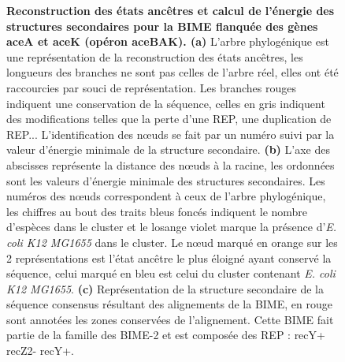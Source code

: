 \documentclass[12pt,a4paper]{report}
\begin{document}
\begin{onehalfspace}
\begin{figure}
{\caption{\textbf{Reconstruction des états ancêtres et calcul de l'énergie des structures secondaires pour la BIME flanquée des gènes aceA et aceK (opéron aceBAK). (a)} L'arbre phylogénique est une représentation de la reconstruction des états ancêtres, les longueurs des branches ne sont pas celles de l'arbre réel, elles ont été raccourcies par souci de représentation. Les branches rouges indiquent une conservation de la séquence, celles en gris indiquent des modifications telles que la perte d'une REP, une duplication de REP... L'identification des nœuds se fait par un numéro suivi par la valeur d'énergie minimale de la structure secondaire. \textbf{(b)} L'axe des abscisses représente la distance des nœuds à la racine, les ordonnées sont les valeurs d'énergie minimale des structures secondaires. Les numéros des nœuds correspondent à ceux de l'arbre phylogénique, les chiffres au bout des traits bleus foncés indiquent le nombre d'espèces dans le cluster et le losange violet marque la présence d'\textit{E. coli K12 MG1655} dans le cluster. Le nœud marqué en orange sur les 2 représentations est l'état ancêtre le plus éloigné ayant conservé la séquence, celui marqué en bleu est celui du cluster contenant \textit{E. coli K12 MG1655}. \textbf{(c)} Représentation de la structure secondaire de la séquence consensus résultant des alignements de la BIME, en rouge sont annotées les zones conservées de l'alignement. Cette BIME fait partie de la famille des BIME-2 et est composée des REP : recY+ recZ2- recY+.}
\label{fig:ancetre} }
\end{figure}


\end{onehalfspace}
\end{document}

